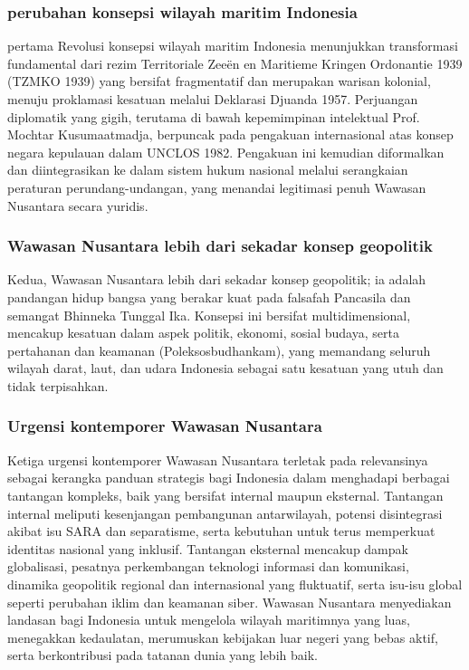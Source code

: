 \documentclass[12pt, a4paper]{article}
\begin{document}
\subsubsection*{perubahan konsepsi wilayah maritim Indonesia} \label{perubahan-konsepsi-wilayah-maritim-indonesia} pertama Revolusi konsepsi wilayah maritim Indonesia menunjukkan transformasi fundamental dari rezim Territoriale Zeeën en Maritieme Kringen Ordonantie 1939 (TZMKO 1939)\cite{TZMKO} yang bersifat fragmentatif dan merupakan warisan kolonial, menuju proklamasi kesatuan melalui Deklarasi Djuanda 1957. Perjuangan diplomatik yang gigih, terutama di bawah kepemimpinan intelektual Prof. Mochtar Kusumaatmadja, berpuncak pada pengakuan internasional atas konsep negara kepulauan dalam UNCLOS 1982. Pengakuan ini kemudian diformalkan dan diintegrasikan ke dalam sistem hukum nasional melalui serangkaian peraturan perundang-undangan, yang menandai legitimasi penuh Wawasan Nusantara secara yuridis.
\cite{rustam2015tantangan}
\subsubsection*{Wawasan Nusantara lebih dari sekadar konsep geopolitik}
Kedua, Wawasan Nusantara lebih dari sekadar konsep geopolitik; ia adalah pandangan hidup bangsa yang berakar kuat pada falsafah Pancasila dan semangat Bhinneka Tunggal Ika. Konsepsi ini bersifat multidimensional, mencakup kesatuan dalam aspek politik, ekonomi, sosial budaya, serta pertahanan dan keamanan (Poleksosbudhankam), yang memandang seluruh wilayah darat, laut, dan udara Indonesia sebagai satu kesatuan yang utuh dan tidak terpisahkan.

\subsubsection*{Urgensi kontemporer Wawasan Nusantara} 
Ketiga urgensi kontemporer Wawasan Nusantara terletak pada relevansinya sebagai kerangka panduan strategis bagi Indonesia dalam menghadapi berbagai tantangan kompleks, baik yang bersifat internal maupun eksternal. Tantangan internal meliputi kesenjangan pembangunan antarwilayah, potensi disintegrasi akibat isu SARA dan separatisme, serta kebutuhan untuk terus memperkuat identitas nasional yang inklusif. Tantangan eksternal mencakup dampak globalisasi, pesatnya perkembangan teknologi informasi dan komunikasi, dinamika geopolitik regional dan internasional yang fluktuatif, serta isu-isu global seperti perubahan iklim dan keamanan siber. Wawasan Nusantara menyediakan landasan bagi Indonesia untuk mengelola wilayah maritimnya yang luas, menegakkan kedaulatan, merumuskan kebijakan luar negeri yang bebas aktif, serta berkontribusi pada tatanan dunia yang lebih baik.
\end{document}

